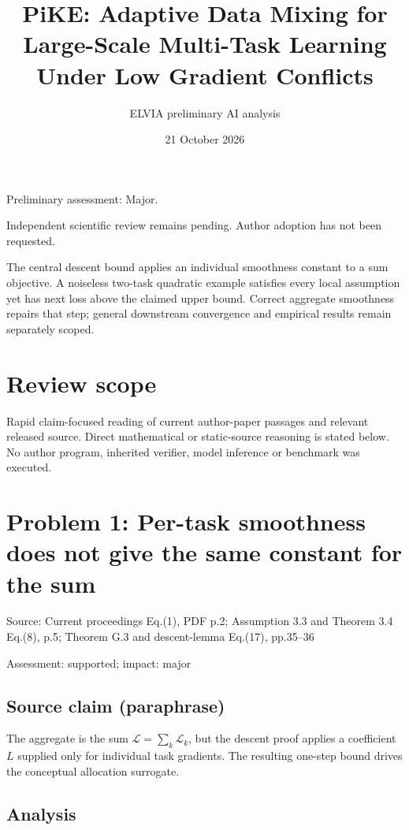 \documentclass[11pt]{article}
\begin{document}
\title{PiKE: Adaptive Data Mixing for Large-Scale Multi-Task Learning Under Low Gradient Conflicts}

\author{ELVIA preliminary AI analysis}\date{21 October 2026}\maketitle

Preliminary assessment: Major.\par

Independent scientific review remains pending. Author adoption has not been requested.

The central descent bound applies an individual smoothness constant to a sum objective. A noiseless two-task quadratic example satisfies every local assumption yet has next loss above the claimed upper bound. Correct aggregate smoothness repairs that step; general downstream convergence and empirical results remain separately scoped.

\section*{Review scope}

Rapid claim-focused reading of current author-paper passages and relevant released source. Direct mathematical or static-source reasoning is stated below. No author program, inherited verifier, model inference or benchmark was executed.

\section*{Problem 1: Per-task smoothness does not give the same constant for the sum}

Source: Current proceedings Eq.(1), PDF p.2; Assumption 3.3 and Theorem 3.4 Eq.(8), p.5; Theorem G.3 and descent-lemma Eq.(17), pp.35–36

Assessment: supported; impact: major

\subsection*{Source claim (paraphrase)}

The aggregate is the sum \(\mathcal L=\sum_k\mathcal L_k\), but the descent proof applies a coefficient \(L\) supplied only for individual task gradients. The resulting one-step bound drives the conceptual allocation surrogate.

\subsection*{Analysis}
\end{document}
